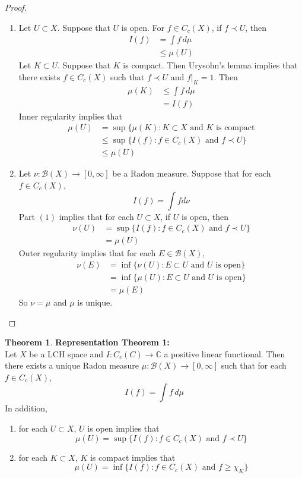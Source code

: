 \documentclass{book}
\theoremstyle{definition}
\newtheorem{thm}[definition]{Theorem}
\newcommand{\C}{\mathbb{C}}
\newcommand{\MB}{\mathcal{B}}
\DeclareMathOperator*{\0}{\mbf{0}}
\DeclareMathOperator*{\1}{\mbf{1}}
\newcommand{\RG}{[0,\infty]}
\newcommand{\dmu}{\, d \mu}
\begin{document}
	\begin{proof}\
	\begin{enumerate}
	\item Let $U \subset X$. Suppose that $U$ is open. For $f \in C_c(X)$, if $f \prec U$, then 
	\begin{align*}
	I(f) 
	&= \int f \dmu \\
	& \leq \mu(U) 
	\end{align*}
	Let $K \subset U$. Suppose that $K$ is compact. Then Urysohn's lemma implies that there exists $f \in C_c(X)$ such that $f \prec U$ and $f|_K = 1$. Then 
	\begin{align*}
	\mu(K) 
	&\leq \int f \dmu \\
	&= I(f)
	\end{align*}
	Inner regularity implies that 
	\begin{align*}
	\mu(U) 
	&= \sup \{\mu(K): K \subset X \text{ and $K$ is compact} \\
	& \leq \sup \{I(f): f \in C_c(X) \text{ and } f \prec U \} \\
	&\leq \mu(U)
	\end{align*}
	\item Let $\nu: \MB(X) \rightarrow \RG$ be a Radon measure. Suppose that for each $f \in C_c(X)$, $$I(f) = \int f d\nu$$
	Part $(1)$ implies that for each $U \subset X$, if $U$ is open, then 
	\begin{align*}
	\nu(U) 
	&= \sup \{I(f): f \in C_c(X) \text{ and } f \prec U \} \\
	&= \mu(U)
\end{align*}		
	Outer regularity implies that for each $E \in \MB(X)$, 
	\begin{align*}
	\nu(E) 
	&= \inf \{\nu(U): E \subset U \text{ and $U$ is open}\} \\
	&= \inf \{\mu(U): E \subset U \text{ and $U$ is open}\} \\
	&= \mu(E)
	\end{align*}
	So $\nu = \mu$ and $\mu$ is unique.
\end{enumerate}		  
	\end{proof}
	
	\begin{thm}\textbf{Representation Theorem 1:}\\
	Let $X$ be a LCH space and $I: C_c(C) \rightarrow \C$ a positive linear functional. Then there exists a unique Radon measure $\mu:\MB(X) \rightarrow \RG$ such that for each $f \in C_c(X)$, $$I(f) = \int f \dmu$$ 
	In addition, 
	\begin{enumerate}
	\item for each $U \subset X$, $U$ is open implies that $$\mu(U) = \sup \{I(f): f \in C_c(X) \text{ and } f \prec U \}$$
	\item for each $K \subset X$, $K$ is compact implies that $$\mu(U) = \inf \{I(f): f \in C_c(X) \text{ and } f  \geq \chi_K \}$$
\end{enumerate}	 
	\end{thm}
	
\end{document}

